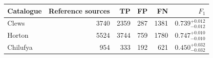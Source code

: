 \begin{tabular}{@{}lrrrrr@{}}
\toprule
Catalogue & Reference sources & TP & FP & FN & \(F_1\) \\
\midrule
Clews & 3740 & 2359 & 287 & 1381 & \(0.739_{-0.012}^{+0.012}\) \\
Horton & 5524 & 3744 & 759 & 1780 & \(0.747_{-0.010}^{+0.010}\) \\
Chilufya & 954 & 333 & 192 & 621 & \(0.450_{-0.032}^{+0.032}\) \\
\bottomrule
\end{tabular}
